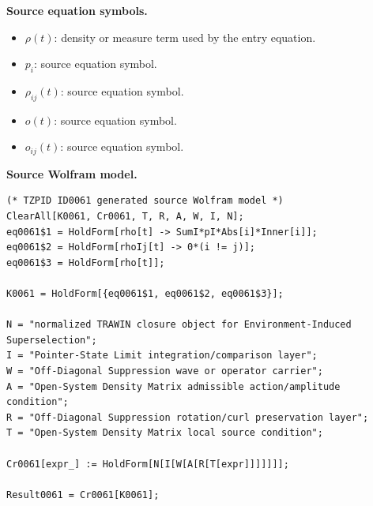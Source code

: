 \begin{minipage}[t]{0.49\linewidth}
\begingroup
\small
\raggedright
\textbf{Source equation symbols.}\par
\begin{itemize}[leftmargin=1.35em,itemsep=1pt,topsep=1pt,parsep=0pt]
    \item $\rho(t)$: density or measure term used by the entry equation.
    \item $p_{i}$: source equation symbol.
    \item $\rho_{ij}(t)$: source equation symbol.
    \item $o(t)$: source equation symbol.
    \item $o_{ij}(t)$: source equation symbol.
\end{itemize}
\endgroup
\end{minipage}\hfill
\begin{minipage}[t]{0.47\linewidth}
\begingroup
\scriptsize
\raggedright
\textbf{Source Wolfram model.}\par
\begin{Verbatim}[fontsize=\tiny,breaklines=true,breakanywhere=true]
(* TZPID ID0061 generated source Wolfram model *)
ClearAll[K0061, Cr0061, T, R, A, W, I, N];
eq0061$1 = HoldForm[rho[t] -> SumI*pI*Abs[i]*Inner[i]];
eq0061$2 = HoldForm[rhoIj[t] -> 0*(i != j)];
eq0061$3 = HoldForm[rho[t]];

K0061 = HoldForm[{eq0061$1, eq0061$2, eq0061$3}];

N = "normalized TRAWIN closure object for Environment-Induced Superselection";
I = "Pointer-State Limit integration/comparison layer";
W = "Off-Diagonal Suppression wave or operator carrier";
A = "Open-System Density Matrix admissible action/amplitude condition";
R = "Off-Diagonal Suppression rotation/curl preservation layer";
T = "Open-System Density Matrix local source condition";

Cr0061[expr_] := HoldForm[N[I[W[A[R[T[expr]]]]]]];

Result0061 = Cr0061[K0061];
\end{Verbatim}
\endgroup
\end{minipage}


